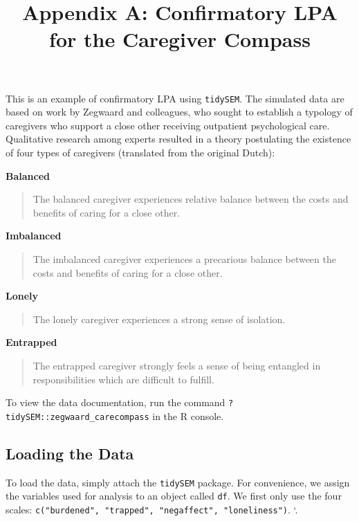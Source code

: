 \documentclass[
  man,floatsintext]{apa6}
\title{Appendix A: Confirmatory LPA for the Caregiver Compass}
\author{\phantom{0}}
\date{}
\affiliation{\phantom{0}}
\begin{document}
\maketitle

This is an example of confirmatory LPA using \texttt{tidySEM}.
The simulated data are based on work by Zegwaard and colleagues,
who sought to establish a typology of caregivers who support a close other receiving outpatient psychological care.
Qualitative research among experts resulted in a theory postulating the existence of four types of caregivers (translated from the original Dutch):

\textbf{Balanced}

\begin{quote}
The balanced caregiver experiences relative balance between the costs and benefits of caring for a close other.
\end{quote}

\textbf{Imbalanced}

\begin{quote}
The imbalanced caregiver experiences a precarious balance between the costs and benefits of caring for a close other.
\end{quote}

\textbf{Lonely}

\begin{quote}
The lonely caregiver experiences a strong sense of isolation.
\end{quote}

\textbf{Entrapped}

\begin{quote}
The entrapped caregiver strongly feels a sense of being entangled in responsibilities which are difficult to fulfill.
\end{quote}

To view the data documentation,
run the command \texttt{?tidySEM::zegwaard\_carecompass} in the R console.

\hypertarget{loading-the-data}{%
\subsection{Loading the Data}\label{loading-the-data}}

To load the data, simply attach the \texttt{tidySEM} package.
For convenience, we assign the variables used for analysis to an object called \texttt{df}.
We first only use the four scales: \texttt{c("burdened",\ "trapped",\ "negaffect",\ "loneliness")}.
`.
\end{document}
